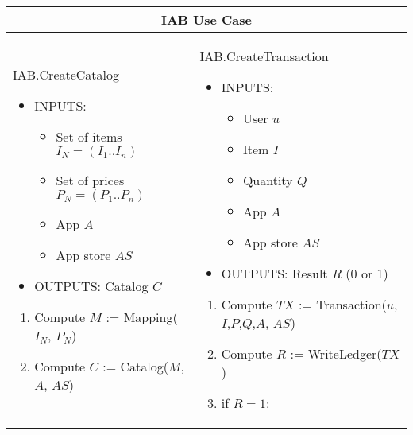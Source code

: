 \begin{table}[H]
\scriptsize
\centering
\begin{tabular}{|p{}p{}|}
\hline
\multicolumn{2}{|c|}{IAB Use Case} \\
\hline \vspace{0.1cm}
\textsf{IAB.CreateCatalog}
\vspace{-0.3cm}
\begin{itemize}
	\item INPUTS:
	\vspace{-0.4cm}
		\begin{itemize}
		\item Set of items $I_N = (I_1..I_n)$
		\item Set of prices $P_N = (P_1..P_n)$
		\item App $A$
		\item App store $AS$
	\end{itemize}
	\item OUTPUTS: Catalog $C$
\end{itemize}
\begin{enumerate}
	\item Compute $M$ := \textsf{Mapping}($I_N$, $P_N$)
	\item Compute $C$ := \textsf{Catalog}($M$, $A$, $AS$)
\end{enumerate} & 
\vspace{0.1cm} \textsf{IAB.CreateTransaction}
\vspace{-0.3cm}
\begin{itemize}
	\item INPUTS:
	\vspace{-0.4cm}
	\begin{itemize}
		\item User $u$
		\item Item $I$
		\item Quantity $Q$
		\item App $A$
		\item App store $AS$
	\end{itemize}
	\item OUTPUTS: Result $R$ (0 or 1)
\end{itemize}
\begin{enumerate}
	\item Compute $TX$ := \textsf{Transaction}($u$,$I$,$P$,$Q$,$A$, $AS$)
	\item Compute $R$ := \textsf{WriteLedger}($TX$)
	\item if $R = 1$:
	\begin{enumerate}

\end{enumerate}
\end{enumerate}
\end{tabular}
\end{table}
